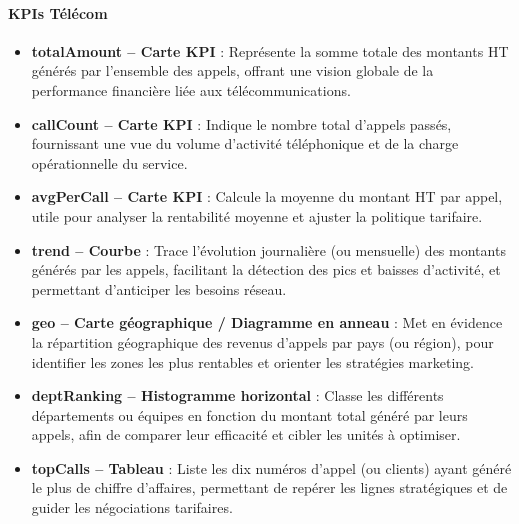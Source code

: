 \documentclass[a4paper,11pt]{report}
\begin{document}
\vspace{1em}

\paragraph{\textbf{KPIs Télécom}}
\begin{itemize}[leftmargin=*, topsep=0pt, itemsep=0.5em]
  \item \textbf{totalAmount – Carte KPI} :  
    Représente la somme totale des montants HT générés par l’ensemble des appels, offrant une vision globale de la performance financière liée aux télécommunications.

  \item \textbf{callCount – Carte KPI} :  
    Indique le nombre total d’appels passés, fournissant une vue du volume d’activité téléphonique et de la charge opérationnelle du service.

  \item \textbf{avgPerCall – Carte KPI} :  
    Calcule la moyenne du montant HT par appel, utile pour analyser la rentabilité moyenne et ajuster la politique tarifaire.

  \item \textbf{trend – Courbe} :  
    Trace l’évolution journalière (ou mensuelle) des montants générés par les appels, facilitant la détection des pics et baisses d’activité, et permettant d’anticiper les besoins réseau.

  \item \textbf{geo – Carte géographique / Diagramme en anneau} :  
    Met en évidence la répartition géographique des revenus d’appels par pays (ou région), pour identifier les zones les plus rentables et orienter les stratégies marketing.

  \item \textbf{deptRanking – Histogramme horizontal} :  
    Classe les différents départements ou équipes en fonction du montant total généré par leurs appels, afin de comparer leur efficacité et cibler les unités à optimiser.

  \item \textbf{topCalls – Tableau} :  
    Liste les dix numéros d’appel (ou clients) ayant généré le plus de chiffre d’affaires, permettant de repérer les lignes stratégiques et de guider les négociations tarifaires.
\end{itemize}
\end{document}
